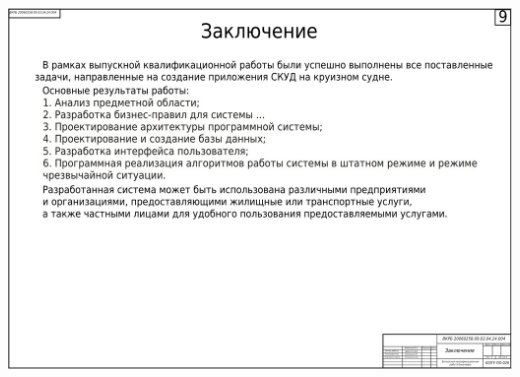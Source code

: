 \begin{landscape}
\begin{плакат}
	\includegraphics[width=0.82\linewidth]{images/плакат9}
	\label{fig:9}
\end{плакат}

\end{landscape}
